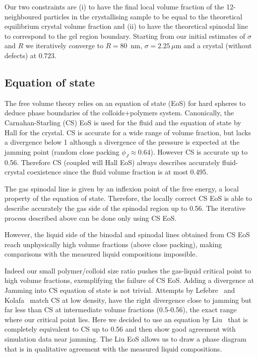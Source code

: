 Our two constraints are (i) to have the final local volume fraction of the 12-neighboured particles in the crystallising sample to be equal to the theoretical equilibrium crystal volume fraction and (ii) to have the theoretical spinodal line to correspond to the gel region boundary. Starting from our initial estimates of $\sigma$ and $R$ we iteratively converge to $R=80$~nm, $\sigma = 2.25\,\mu$m and a crystal (without defects) at $0.723$.

\subsection*{Equation of state}

The free volume theory relies on an equation of state (EoS) for hard spheres to deduce phase boundaries of the colloids+polymers system. Canonically, the Carnahan-Starling (CS) EoS is used for the fluid and the equation of state by Hall for the crystal. CS is accurate for a wide range of volume fraction, but lacks a divergence below 1 although a divergence of the pressure is expected at the jamming point (random close packing $\phi_J\approx 0.64$). However CS is accurate up to 0.56. Therefore CS (coupled will Hall EoS) always describes accurately fluid-crystal coexistence since the fluid volume fraction is at most 0.495.

The gas spinodal line is given by an inflexion point of the free energy, a local property of the equation of state. Therefore, the locally correct CS EoS is able to describe accurately the gas side of the spinodal region up to 0.56. The iterative process described above can be done only using CS EoS.

However, the liquid side of the binodal and spinodal lines obtained from CS EoS reach unphysically high volume fractions (above close packing), making comparisons with the measured liquid compositions impossible.

Indeed our small polymer/colloid size ratio pushes the gas-liquid critical point to high volume fractions, exemplifying the failure of CS EoS. Adding a divergence at Jamming into CS equation of state is not trivial. Attempts by Lefebre~\cite{LeFevre1972} and Kolafa~\cite{Kolafa2004} match CS at low density, have the right divergence close to jamming but far less than CS at intermediate volume fractions (0.5-0.56), the exact range where our critical point lies. Here we decided to use an equation by Liu~\cite{Liu2006a} that is completely equivalent to CS up to 0.56 and then show good agreement with simulation data near jamming.
%
The Liu EoS allows us to draw a phase diagram that is in qualitative agreement with the measured liquid compositions.

